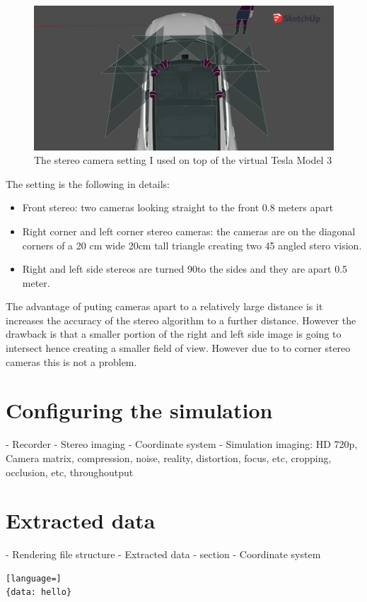\begin{figure}[!ht]
    \centering
    \includegraphics[width=150mm, keepaspectratio]{figures/3dmodel3.png}
    \caption{The stereo camera setting I used on top of the virtual Tesla Model 3}
    \label{fig:3dmodel3}
\end{figure}

The setting is the following in details: 
\begin{itemize}
    \item Front stereo: two cameras looking straight to the front 0.8 meters
    apart
    \item Right corner and left corner stereo cameras: the cameras are on the
    diagonal corners of a 20 cm wide 20cm tall triangle creating two 45\degree
    angled stero vision.
    \item Right and left side stereos are turned 90\degree to the sides and they are apart 0.5 meter.
\end{itemize}

The advantage of puting cameras apart to a relatively large distance is it
increases the accuracy of the stereo algorithm to a further distance. However
the drawback is that a smaller portion of the right and left side image is going
to intersect hence creating a smaller field of view. However due to to corner
stereo cameras this is not a problem.




\section{Configuring the simulation}
- Recorder
- Stereo imaging
- Coordinate system
- Simulation imaging: HD 720p, Camera matrix, compression, noise, reality,
distortion, focus, etc, cropping, occlusion, etc, throughoutput
\section{Extracted data}
- Rendering file structure 
- Extracted data - section
- Coordinate system
\begin{lstlisting}[language=]
{data: hello}
\end{lstlisting}
